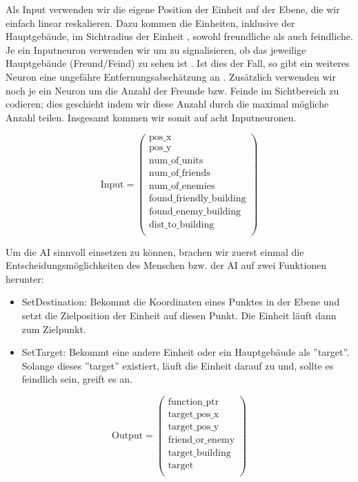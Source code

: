 \documentclass[
	12pt,
	a4paper,
	BCOR10mm,
	DIV14,
	headsepline,
	usegeometry,
]{scrreprt}
\begin{document}
Als Input verwenden wir die eigene Position der Einheit  auf der Ebene, die wir einfach linear reskalieren.
Dazu kommen die Einheiten, inklusive der Hauptgebäude, im Sichtradius der Einheit , sowohl freundliche als auch feindliche.
Je ein Inputneuron verwenden wir um zu signalisieren, ob das jeweilige Hauptgebäude (Freund/Feind) zu sehen ist .
Ist dies der Fall, so gibt ein weiteres Neuron eine ungefähre Entfernungsabschätzung an .
Zusätzlich verwenden wir noch je ein Neuron um die Anzahl der Freunde bzw. Feinde  im Sichtbereich zu codieren; dies geschieht indem wir diese Anzahl durch die maximal mögliche Anzahl teilen.
Insgesamt kommen wir somit auf acht Inputneuronen.

\begin{equation}
	\text{Input} = \left( \begin{matrix}
		\text{pos\_x} \\
		\text{pos\_y} \\
		\text{num\_of\_units} \\
		\text{num\_of\_friends} \\
		\text{num\_of\_enemies} \\
		\text{found\_friendly\_building} \\
		\text{found\_enemy\_building} \\
		\text{dist\_to\_building} \\
	\end{matrix} \right)
\end{equation}


Um die AI sinnvoll einsetzen zu können, brachen wir zuerst einmal die Entscheidungsmöglichkeiten des Menschen bzw. der AI auf zwei Funktionen herunter: 

\begin{itemize}
	\item SetDestination: Bekommt die Koordinaten eines Punktes in der Ebene und setzt die Zielposition der Einheit auf diesen Punkt.
Die Einheit läuft dann zum Zielpunkt.
	\item SetTarget: Bekommt eine andere Einheit oder ein Hauptgebäude als ''target''.
Solange dieses ''target'' existiert, läuft die Einheit darauf zu und, sollte es feindlich sein, greift es an.
\end{itemize}

\begin{equation}
	\text{Output} = \left( \begin{matrix}
		\text{function\_ptr} \\
		\text{target\_pos\_x} \\
		\text{target\_pos\_y} \\
		\text{friend\_or\_enemy} \\
		\text{target\_building} \\
		\text{target} \\
	\end{matrix} \right)
\end{equation}
\end{document}
